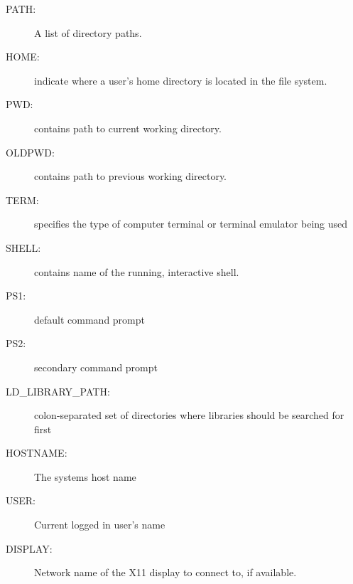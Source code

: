 \documentclass[10pt,t]{beamer}
\newcommand*\mybigstar{\textcolor{lubrown!90!yellow}{%
  \ensuremath{\bigstar}}}
\newcommand{\Verblubrown}[1]{\Verb[formatcom=\color{lubrown},fontseries=b,commandchars=\\\{\}]|#1|}
\begin{document}
\begin{frame}
\begin{itemize}
  \end{itemize}
  \framebreak
  \begin{description}
    \item[PATH:] A list of directory paths.
    \item[HOME:] indicate where a user's home directory is located in the file system.
    \item[PWD:] contains path to current working directory.
    \item[OLDPWD:] contains path to previous working directory.
    \item[TERM:] specifies the type of computer terminal or terminal emulator being used
    \item[SHELL:] contains name of the running, interactive shell.
    \item[PS1:] default command prompt
    \item[PS2:] secondary command prompt
    \item[LD\_LIBRARY\_PATH:] colon-separated set of directories where libraries should be searched for first
    \item[HOSTNAME:] The systems host name
    \item[USER:] Current logged in user's name
    \item[DISPLAY:] Network name of the X11 display to connect to, if available.
  \end{description}
  \framebreak
\end{frame}
\end{document}
